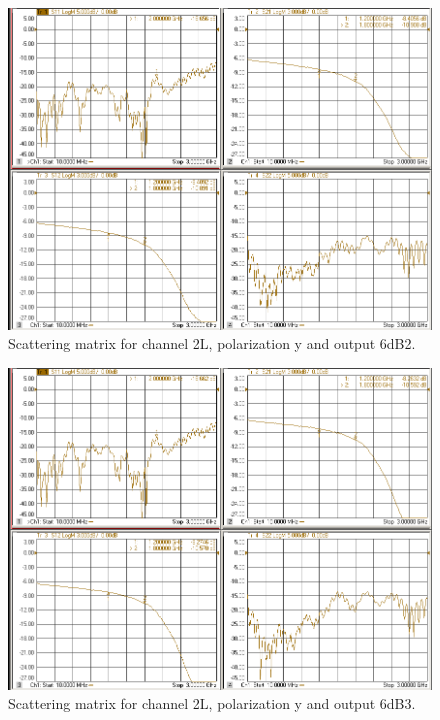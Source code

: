 \documentclass[12pt,a4paper,oneside]{article}
\begin{document}
\begin{figure}[H]
\centering
\includegraphics[width=0.9\linewidth]{VNA_results/2Ly_6dB2.png}
\caption{Scattering matrix for channel 2L, polarization y and output 6dB2.}
\label{fig:2Ly_6dB2}
\end{figure}


\begin{figure}[H]
\centering
\includegraphics[width=0.9\linewidth]{VNA_results/2Ly_6dB3.png}
\caption{Scattering matrix for channel 2L, polarization y and output 6dB3.}
\label{fig:2Ly_6dB3}
\end{figure}
\end{document}

